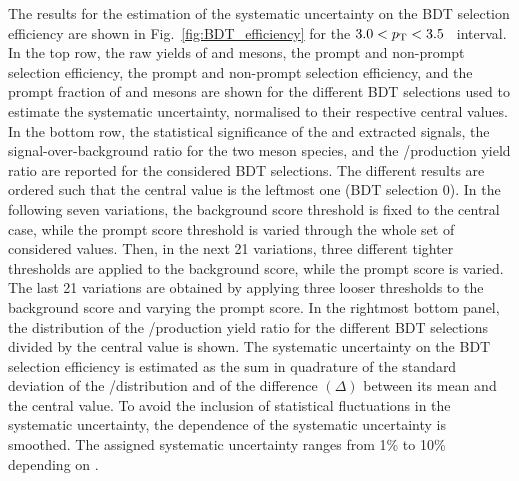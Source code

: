 The results for the estimation of the systematic uncertainty on the BDT selection efficiency are shown in Fig.~\ref{fig:BDT_efficiency} for the \mbox{$3.0<p_\mathrm{T}<3.5$~\gevc} \pt interval. In the top row, the raw yields of \ds and \dpl mesons, the prompt and non-prompt \ds selection efficiency, the prompt and non-prompt \dpl selection efficiency, and the prompt fraction of \ds and \dpl mesons are shown for the different BDT selections used to estimate the systematic uncertainty, normalised to their respective central values. In the bottom row, the statistical significance of the \ds and \dpl extracted signals, the signal-over-background ratio for the two meson species, and the \ds/\dpl production yield ratio are reported for the considered BDT selections. The different results are ordered such that the central value is the leftmost one (BDT selection 0). In the following seven variations, the background score threshold is fixed to the central case, while the prompt score threshold is varied through the whole set of considered values. Then, in the next 21 variations, three different tighter thresholds are applied to the background score, while the prompt score is varied. The last 21 variations are obtained by applying three looser thresholds to the background score and varying the prompt score. In the rightmost bottom panel, the distribution of the \ds/\dpl production yield ratio for the different BDT selections divided by the central value is shown. The systematic uncertainty on the BDT selection efficiency is estimated as the sum in quadrature of the standard deviation of the \ds/\dpl distribution and of the difference $(\Delta)$ between its mean and the central value. To avoid the inclusion of statistical fluctuations in the systematic uncertainty, the \pt dependence of the systematic uncertainty is smoothed. The assigned systematic uncertainty ranges from 1\% to 10\% depending on \pt.

